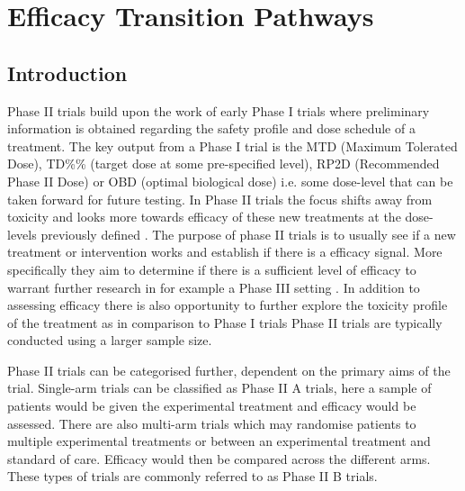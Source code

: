 
\chapter{Efficacy Transition Pathways} %

\label{etp} %


\section{Introduction}
\label{etp:Introduction}

Phase \RN{2} trials build upon the work of early Phase \RN{1} trials where preliminary information is obtained regarding the safety profile and dose schedule of a treatment. The key output from a Phase \RN{1} trial is the MTD (Maximum Tolerated Dose), TD\%\% (target dose at some pre-specified level), RP2D (Recommended Phase \RN{2} Dose) or OBD (optimal biological dose) i.e. some dose-level that can be taken forward for future testing. In Phase \RN{2} trials the focus shifts away from toxicity and looks more towards efficacy of these new treatments at the dose-levels previously defined \cite{berryBayesianAdaptiveMethods2010}. The purpose of phase \RN{2} trials is to usually see if a new treatment or intervention works and establish if there is a efficacy signal. More specifically they aim to determine if there is a sufficient level of efficacy to warrant further research in for example a Phase \RN{3} setting \cite{juliousIntroductionStatisticsEarly2010}. In addition to assessing efficacy there is also opportunity to further explore the toxicity profile of the treatment as in comparison to Phase \RN{1} trials Phase \RN{2} trials are typically conducted using a larger sample size.  

Phase \RN{2} trials can be categorised further, dependent on the primary aims of the trial. Single-arm trials can be classified as Phase \RN{2} A trials, here a sample of patients would be given the experimental treatment and efficacy would be assessed. There are also multi-arm trials which may randomise patients to multiple experimental treatments or between an experimental treatment and standard of care. Efficacy would then be compared across the different arms. These types of trials are commonly referred to as Phase \RN{2} B trials. 

